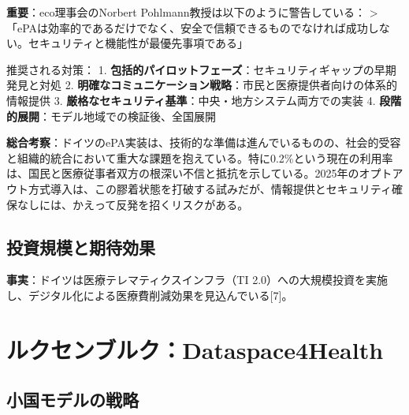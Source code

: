 \documentclass[
  a4paper,
  a4paper,
  11pt]{ltjsbook}
\begin{document}
\begin{tcolorbox}[enhanced jigsaw, toprule=.15mm, bottomtitle=1mm, coltitle=black, left=2mm, opacityback=0, arc=.35mm, colbacktitle=quarto-callout-important-color!10!white, colback=white, opacitybacktitle=0.6, bottomrule=.15mm, rightrule=.15mm, breakable, title=\textcolor{quarto-callout-important-color}{\faExclamation}\hspace{0.5em}{Important}, toptitle=1mm, titlerule=0mm, colframe=quarto-callout-important-color-frame, leftrule=.75mm]

\textbf{重要}：eco理事会のNorbert
Pohlmann教授は以下のように警告している： \textgreater{}
「ePAは効率的であるだけでなく、安全で信頼できるものでなければ成功しない。セキュリティと機能性が最優先事項である」

推奨される対策： 1.
\textbf{包括的パイロットフェーズ}：セキュリティギャップの早期発見と対処
2.
\textbf{明確なコミュニケーション戦略}：市民と医療提供者向けの体系的情報提供
3. \textbf{厳格なセキュリティ基準}：中央・地方システム両方での実装 4.
\textbf{段階的展開}：モデル地域での検証後、全国展開

\end{tcolorbox}

\textbf{総合考察}：ドイツのePA実装は、技術的な準備は進んでいるものの、社会的受容と組織的統合において重大な課題を抱えている。特に0.2\%という現在の利用率は、国民と医療従事者双方の根深い不信と抵抗を示している。2025年のオプトアウト方式導入は、この膠着状態を打破する試みだが、情報提供とセキュリティ確保なしには、かえって反発を招くリスクがある。

\subsection{投資規模と期待効果}\label{ux6295ux8cc7ux898fux6a21ux3068ux671fux5f85ux52b9ux679c}

\textbf{事実}：ドイツは医療テレマティクスインフラ（TI
2.0）への大規模投資を実施し、デジタル化による医療費削減効果を見込んでいる{[}7{]}。

\section{ルクセンブルク：Dataspace4Health}\label{ux30ebux30afux30bbux30f3ux30d6ux30ebux30afdataspace4health}

\subsection{小国モデルの戦略}\label{ux5c0fux56fdux30e2ux30c7ux30ebux306eux6226ux7565}
\end{document}
